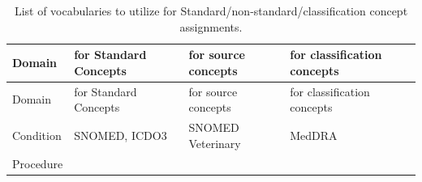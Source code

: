 \documentclass[11pt]{book}
\theoremstyle{definition}
\theoremstyle{definition}
\theoremstyle{definition}
\theoremstyle{remark}
\begin{document}
\begin{longtable}[]{@{}llll@{}}
\caption{\label{tab:vocabList} List of vocabularies to utilize for
Standard/non-standard/classification concept
assignments.}\tabularnewline
\toprule
\begin{minipage}[b]{0.12\columnwidth}\raggedright\strut
Domain\strut
\end{minipage} & \begin{minipage}[b]{0.21\columnwidth}\raggedright\strut
for Standard Concepts\strut
\end{minipage} & \begin{minipage}[b]{0.21\columnwidth}\raggedright\strut
for source concepts\strut
\end{minipage} & \begin{minipage}[b]{0.18\columnwidth}\raggedright\strut
for classification concepts\strut
\end{minipage}\tabularnewline
\midrule
\endfirsthead
\toprule
\begin{minipage}[b]{0.12\columnwidth}\raggedright\strut
Domain\strut
\end{minipage} & \begin{minipage}[b]{0.21\columnwidth}\raggedright\strut
for Standard Concepts\strut
\end{minipage} & \begin{minipage}[b]{0.21\columnwidth}\raggedright\strut
for source concepts\strut
\end{minipage} & \begin{minipage}[b]{0.18\columnwidth}\raggedright\strut
for classification concepts\strut
\end{minipage}\tabularnewline
\midrule
\endhead
\begin{minipage}[t]{0.12\columnwidth}\raggedright\strut
Condition\strut
\end{minipage} & \begin{minipage}[t]{0.21\columnwidth}\raggedright\strut
SNOMED, ICDO3\strut
\end{minipage} & \begin{minipage}[t]{0.21\columnwidth}\raggedright\strut
SNOMED Veterinary\strut
\end{minipage} & \begin{minipage}[t]{0.18\columnwidth}\raggedright\strut
MedDRA\strut
\end{minipage}\tabularnewline
\begin{minipage}[t]{0.12\columnwidth}\raggedright\strut
Procedure\strut
\end{minipage} & \begin{minipage}[t]{0.21\columnwidth}\raggedright\strut

\end{minipage}
\end{longtable}
\end{document}
